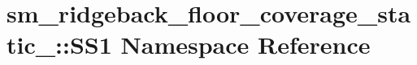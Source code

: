 \hypertarget{namespacesm__ridgeback__floor__coverage__static__1_1_1SS1}{}\section{sm\+\_\+ridgeback\+\_\+floor\+\_\+coverage\+\_\+static\+\_\+:\+:S\+S1 Namespace Reference}
\label{namespacesm__ridgeback__floor__coverage__static__1_1_1SS1}
